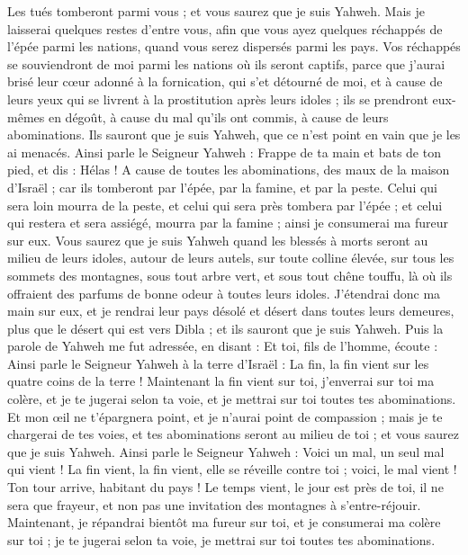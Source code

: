 \begin{multicols}{2}
Les tués tomberont parmi vous ; et vous saurez que je suis Yahweh.
Mais je laisserai quelques restes d’entre vous, afin que vous ayez quelques réchappés de l'épée parmi les nations, quand vous serez dispersés parmi les pays.
Vos réchappés se souviendront de moi parmi les nations où ils seront captifs, parce que j’aurai brisé leur cœur adonné à la fornication, qui s’et détourné de moi, et à cause de leurs yeux qui se livrent à la prostitution après leurs idoles ; ils se prendront eux-mêmes en dégoût, à cause du mal qu’ils ont commis, à cause de leurs abominations.
Ils sauront que je suis Yahweh, que ce n’est point en vain que je les ai menacés.
Ainsi parle le Seigneur Yahweh : Frappe de ta main et bats de ton pied, et dis : Hélas ! A cause de toutes les abominations, des maux de la maison d'Israël ; car ils tomberont par l'épée, par la famine, et par la peste.
Celui qui sera loin mourra de la peste, et celui qui sera près tombera par l'épée ; et celui qui restera et sera assiégé, mourra par la famine ; ainsi je consumerai ma fureur sur eux.
Vous saurez que je suis Yahweh quand les blessés à morts seront au milieu de leurs idoles, autour de leurs autels, sur toute colline élevée, sur tous les sommets des montagnes, sous tout arbre vert, et sous tout chêne touffu, là où ils offraient des parfums de bonne odeur à toutes leurs idoles.
J'étendrai donc ma main sur eux, et je rendrai leur pays désolé et désert dans toutes leurs demeures, plus que le désert qui est vers Dibla ; et ils sauront que je suis Yahweh.
\VerseOne{}Puis la parole de Yahweh me fut adressée, en disant :
Et toi, fils de l’homme, écoute : Ainsi parle le Seigneur Yahweh à la terre d'Israël : La fin, la fin vient sur les quatre coins de la terre !
Maintenant la fin vient sur toi, j'enverrai sur toi ma colère, et je te jugerai selon ta voie, et je mettrai sur toi toutes tes abominations.
Et mon œil ne t'épargnera point, et je n'aurai point de compassion ; mais je te chargerai de tes voies, et tes abominations seront au milieu de toi ; et vous saurez que je suis Yahweh.
Ainsi parle le Seigneur Yahweh : Voici un mal, un seul mal qui vient !
La fin vient, la fin vient, elle se réveille contre toi ; voici, le mal vient !
Ton tour arrive, habitant du pays ! Le temps vient, le jour est près de toi, il ne sera que frayeur, et non pas une invitation des montagnes  à s’entre-réjouir.
Maintenant, je répandrai bientôt ma fureur sur toi, et je consumerai ma colère sur toi ; je te jugerai selon ta voie, je mettrai sur toi toutes tes abominations.

\end{multicols}
